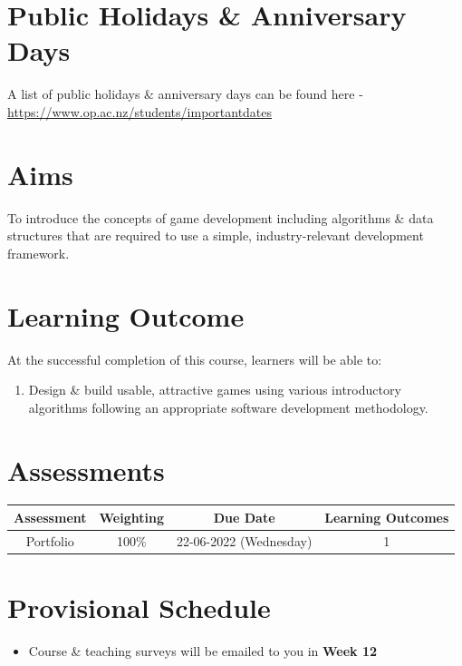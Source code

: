 \documentclass{article}
\begin{document}
\section*{Public Holidays \& Anniversary Days}
A list of public holidays \& anniversary days can be found here - \href{https://www.op.ac.nz/students/importantdates}{https://www.op.ac.nz/students/importantdates}

\section*{Aims}
To introduce the concepts of game development including algorithms \& data structures that are required to use a simple, industry-relevant development framework.

\section*{Learning Outcome}
At the successful completion of this course, learners will be able to:
\begin{enumerate}
	\item Design \& build usable, attractive games using various introductory algorithms following an appropriate software development methodology.
\end{enumerate}

\section*{Assessments}
\renewcommand{\arraystretch}{1.5}
\begin{tabular}{|c|c|c|c|}
	\hline
	\textbf{Assessment}                                 & \textbf{Weighting} & \textbf{Due Date}            & \textbf{Learning Outcomes} \\ \hline
	\small Portfolio                        & \small 100\%        & \small 22-06-2022 (Wednesday)  & \small 1                   \\ \hline
\end{tabular}


\section*{Provisional Schedule}

\begin{itemize}
	\item Course \& teaching surveys will be emailed to you in \textbf{Week 12}
\end{itemize}
\end{document}
